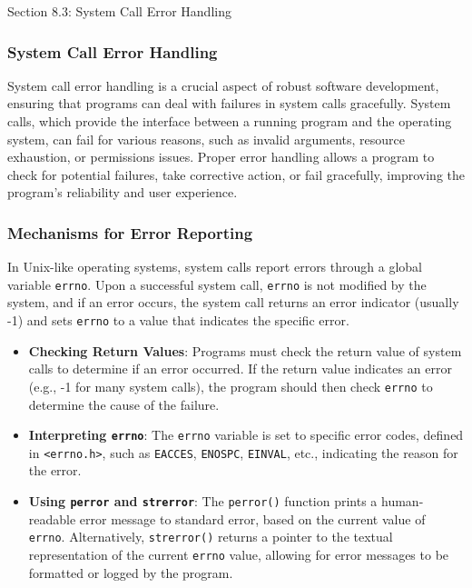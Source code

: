 \begin{notes}{Section 8.3: System Call Error Handling}
    \subsubsection*{System Call Error Handling}

    System call error handling is a crucial aspect of robust software development, ensuring that programs can deal with failures in system calls gracefully. System calls, which provide the interface 
    between a running program and the operating system, can fail for various reasons, such as invalid arguments, resource exhaustion, or permissions issues. Proper error handling allows a program to 
    check for potential failures, take corrective action, or fail gracefully, improving the program's reliability and user experience. \vspace*{1em}
    
    \subsubsection*{Mechanisms for Error Reporting}
    
    In Unix-like operating systems, system calls report errors through a global variable \texttt{errno}. Upon a successful system call, \texttt{errno} is not modified by the system, and if an error 
    occurs, the system call returns an error indicator (usually -1) and sets \texttt{errno} to a value that indicates the specific error.
    
    \begin{itemize}
        \item \textbf{Checking Return Values}: Programs must check the return value of system calls to determine if an error occurred. If the return value indicates an error (e.g., -1 for many system calls), 
        the program should then check \texttt{errno} to determine the cause of the failure.
        \item \textbf{Interpreting \texttt{errno}}: The \texttt{errno} variable is set to specific error codes, defined in \texttt{<errno.h>}, such as \texttt{EACCES}, \texttt{ENOSPC}, \texttt{EINVAL}, 
        etc., indicating the reason for the error.
        \item \textbf{Using \texttt{perror} and \texttt{strerror}}: The \texttt{perror()} function prints a human-readable error message to standard error, based on the current value of \texttt{errno}. 
        Alternatively, \texttt{strerror()} returns a pointer to the textual representation of the current \texttt{errno} value, allowing for error messages to be formatted or logged by the program.
    \end{itemize}
    

\end{notes}
